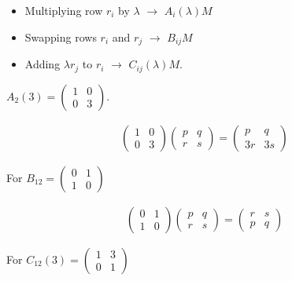 \documentclass{article}
\theoremstyle{definition} \newtheorem*{definition}{Definition}
\begin{document}
    \begin{itemize}
      \item 
    Multiplying row $r_i$ by $\lambda$ $\longrightarrow$ $A_i(\lambda)M$
    \item
    Swapping rows $r_i$ and $r_j$ $\longrightarrow$ $B_{ij}M$
    \item
    Adding $\lambda r_j$ to $r_i$ $\longrightarrow$ $C_{ij}(\lambda)M$.\\
    \end{itemize}
    \begin{exmps}
  $A_2(3) = \left( 
\begin{matrix}
  1 & 0 \\
  0 & 3
\end{matrix}
  \right)$.

  \begin{align*}
  \left( 
  \begin{matrix}
    1 & 0 \\
    0 & 3
  \end{matrix}
  \right)\left( 
  \begin{matrix}
    p & q \\
    r & s
  \end{matrix}
  \right) = \left( 
  \begin{matrix}
    p & q \\
    3r & 3s
  \end{matrix}
  \right)
\end{align*}

  For $
    B_{12} = \left( 
  \begin{matrix}
    0 & 1 \\
    1 & 0
  \end{matrix}
  \right)
$

\begin{align*}  
\left( 
  \begin{matrix}
    0 & 1\\
    1 & 0
  \end{matrix}
  \right)\left( 
  \begin{matrix}
    p & q \\
    r & s
  \end{matrix}
  \right) = \left( 
  \begin{matrix}
    r & s \\
    p & q
  \end{matrix}
  \right)
\end{align*}

For $
  C_{12}(3) = \left( 
  \begin{matrix}
    1 & 3 \\
    0 & 1
  \end{matrix}
  \right)
$


\end{exmps}
\end{document}

